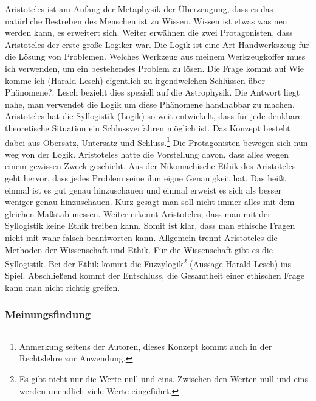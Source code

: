 Aristoteles ist am Anfang der Metaphysik der Überzeugung, dass es das natürliche Bestreben des Menschen ist zu Wissen. Wissen ist etwas was neu werden kann, es erweitert sich. Weiter erwähnen die zwei Protagonisten, dass Aristoteles der erste große Logiker war. Die Logik ist eine Art Handwerkszeug für die Lösung von Problemen. Welches Werkzeug aus meinem Werkzeugkoffer muss ich verwenden, um ein bestehendes Problem zu lösen. Die Frage kommt auf \glqq Wie komme ich (Harald Lesch) eigentlich zu irgendwelchen Schlüssen über Phänomene?\grqq. Lesch bezieht dies speziell auf die Astrophysik. Die Antwort liegt nahe, man verwendet die Logik um diese Phänomene handhabbar zu machen. Aristoteles hat die Syllogistik (Logik) so weit entwickelt, dass für jede denkbare theoretische Situation ein Schlussverfahren möglich ist. Das Konzept besteht dabei aus Obersatz, Untersatz und Schluss.\footnote{Anmerkung seitens der Autoren, dieses Konzept kommt auch in der Rechtslehre zur Anwendung.} Die Protagonisten bewegen sich nun weg von der Logik. Aristoteles hatte die Vorstellung davon, dass alles wegen einem gewissen Zweck geschieht. Aus der Nikomachische Ethik des Aristoteles geht hervor, dass jedes Problem seine ihm eigne Genauigkeit hat. Das heißt einmal ist es gut genau hinzuschauen und einmal erweist es sich als besser weniger genau hinzuschauen. Kurz gesagt man soll nicht immer alles mit dem gleichen Maßstab messen. Weiter erkennt Aristoteles, dass man mit der Syllogistik keine Ethik treiben kann. Somit ist klar, dass man ethische Fragen nicht mit wahr-falsch beantworten kann. Allgemein trennt Aristoteles die Methoden der Wissenschaft und Ethik. Für die Wissenschaft gibt es die Syllogistik. Bei der Ethik kommt die Fuzzylogik\footnote{Es gibt nicht nur die Werte null und eins. Zwischen  den Werten null und eins werden unendlich viele Werte eingeführt.} (Aussage Harald Lesch) ins Spiel. Abschließend kommt der Entschluss, die Gesamtheit einer ethischen Frage kann man nicht richtig greifen. 

\subsubsection{Meinungsfindung}

